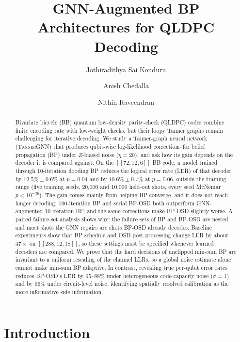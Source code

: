 \documentclass[a4paper,twocolumn,11pt,nopdfoutputerror]{quantumarticle}
\title{GNN-Augmented BP Architectures for QLDPC Decoding}
\author{Jothiradithya Sai Konduru}
\affiliation{Paradise Valley High School, Phoenix, AZ, USA}
\author{Anish Chedalla}
\affiliation{Paradise Valley High School, Phoenix, AZ, USA}
\author{Nithin Raveendran}
\affiliation{Department of Electrical and Computer Engineering,
             University of Arizona, Tucson, AZ, USA}
\newcommand{\code}[3]{\ensuremath{[\![#1,#2,#3]\!]}}
\begin{document}
\maketitle

\begin{abstract}
Bivariate bicycle (BB) quantum low-density parity-check (QLDPC) codes
combine finite encoding rate with low-weight checks, but their loopy
Tanner graphs remain challenging for iterative decoding. We study a
Tanner-graph neural network (\textsc{TannerGNN}) that produces
qubit-wise log-likelihood corrections for belief propagation (BP) under
$Z$-biased noise ($\eta=20$), and ask how its gain depends on the decoder
it is compared against. On the $\code{72}{12}{6}$ BB code, a model trained
through 10-iteration flooding BP reduces the logical error rate (LER) of
that decoder by $12.5\%\pm0.6\%$ at $p=0.04$ and by $10.6\%\pm0.7\%$ at
$p=0.06$, outside the training range (five training seeds, 20{,}000 and
10{,}000 held-out shots, every seed McNemar $p<10^{-36}$). The gain comes
mainly from helping BP converge, and it does not reach longer decoding:
100-iteration BP and serial BP-OSD both outperform GNN-augmented
10-iteration BP, and the same corrections make BP-OSD slightly worse. A
paired failure-set analysis shows why: the failure sets of BP and BP-OSD
are nested, and most shots the GNN repairs are shots BP-OSD already
decodes. Baseline experiments show that BP schedule and OSD
post-processing change LER by about $47\times$ on
$\code{288}{12}{18}$, so these settings must be specified whenever
learned decoders are compared. We prove that the hard decisions of
unclipped min-sum BP are invariant to a uniform rescaling of the channel
LLRs, so a global noise estimate alone cannot make min-sum BP adaptive.
In contrast, revealing true per-qubit error rates reduces BP-OSD's LER by
$65$--$88\%$ under heterogeneous code-capacity noise ($\sigma=1$) and by
$56\%$ under circuit-level noise, identifying spatially resolved
calibration as the more informative side information.
\end{abstract}

\section{Introduction}
\end{document}
